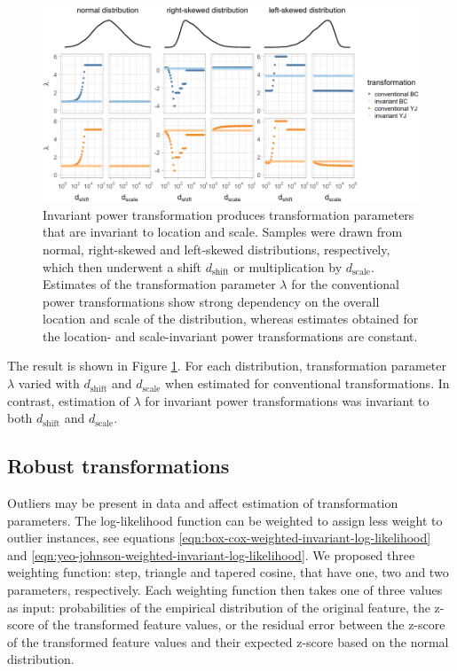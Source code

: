 \documentclass[
  a4paper,
]{article}
\begin{document}
\begin{figure}

{\centering \includegraphics{manuscript_files/figure-latex/shifted-distributions-1} 

}

\caption{Invariant power transformation produces transformation parameters that are invariant to location and scale. Samples were drawn from normal, right-skewed and left-skewed distributions, respectively, which then underwent a shift $d_{\text{shift}}$ or multiplication by $d_{\text{scale}}$. Estimates of the transformation parameter $\lambda$ for the conventional power transformations show strong dependency on the overall location and scale of the distribution, whereas estimates obtained for the location- and scale-invariant power transformations are constant.}\label{fig:shifted-distributions}
\end{figure}

The result is shown in Figure \ref{fig:shifted-distributions}. For each
distribution, transformation parameter \(\lambda\) varied with
\(d_{\text{shift}}\) and \(d_{\text{scale}}\) when estimated for
conventional transformations. In contrast, estimation of \(\lambda\) for
invariant power transformations was invariant to both
\(d_{\text{shift}}\) and \(d_{\text{scale}}\).

\subsection{Robust transformations}\label{robust-transformations}

Outliers may be present in data and affect estimation of transformation
parameters. The log-likelihood function can be weighted to assign less
weight to outlier instances, see equations
\ref{eqn:box-cox-weighted-invariant-log-likelihood} and
\ref{eqn:yeo-johnson-weighted-invariant-log-likelihood}. We proposed
three weighting function: step, triangle and tapered cosine, that have
one, two and two parameters, respectively. Each weighting function then
takes one of three values as input: probabilities of the empirical
distribution of the original feature, the z-score of the transformed
feature values, or the residual error between the z-score of the
transformed feature values and their expected z-score based on the
normal distribution.
\end{document}
